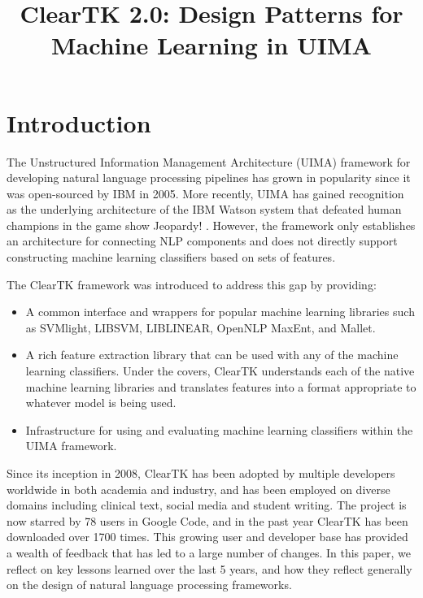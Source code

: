 \documentclass[10pt, a4paper]{article}
\title{ClearTK 2.0: Design Patterns for Machine Learning in UIMA}
\begin{document}
\maketitleabstract

\section{Introduction}
The Unstructured Information Management Architecture (UIMA) framework for developing natural language processing pipelines has grown in popularity since it was open-sourced by IBM in 2005.  More recently, UIMA has gained recognition as the underlying architecture of the IBM Watson system that defeated human champions in the game show Jeopardy! \cite{ferrucci_building_2010}.
However, the framework only establishes an architecture for connecting NLP components and does not directly support constructing machine learning classifiers based on sets of features.

The ClearTK framework was introduced to address this gap \cite{ogren-etal:2008:UIMA-LREC,ogren-etal:2009:UIMA-GSCL} by providing:
\begin{itemize}
\item A common interface and wrappers for popular machine learning libraries such as SVMlight, LIBSVM, LIBLINEAR, OpenNLP MaxEnt, and Mallet.
\item A rich feature extraction library that can be used with any of the machine learning classifiers. Under the covers, ClearTK understands each of the native machine learning libraries and translates features into a format appropriate to whatever model is being used.
\item Infrastructure for using and evaluating machine learning classifiers within the UIMA framework.
\end{itemize}

Since its inception in 2008, ClearTK has been adopted by multiple developers worldwide in both academia and industry, and has been employed on diverse domains including clinical text, social media and student writing.  The project is now starred by 78 users in Google Code, and in the past year ClearTK has been downloaded over 1700 times.  This growing user and developer base has provided a wealth of feedback that has led to a large number of changes.  In this paper, we reflect on key lessons learned over the last 5 years, and how they reflect generally on the design of natural language processing frameworks.
\end{document}
